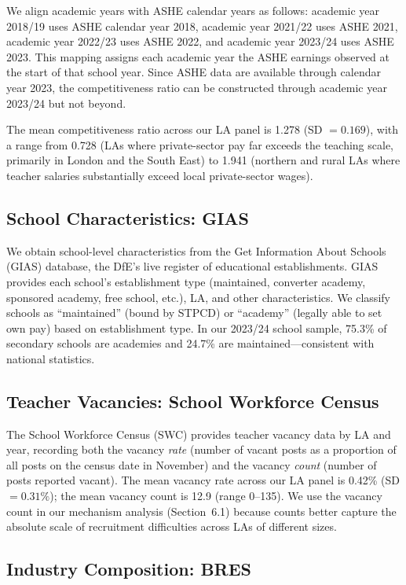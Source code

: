 \documentclass[12pt]{article}
\begin{document}
We align academic years with ASHE calendar years as follows: academic year 2018/19 uses ASHE calendar year 2018, academic year 2021/22 uses ASHE 2021, academic year 2022/23 uses ASHE 2022, and academic year 2023/24 uses ASHE 2023. This mapping assigns each academic year the ASHE earnings observed at the start of that school year. Since ASHE data are available through calendar year 2023, the competitiveness ratio can be constructed through academic year 2023/24 but not beyond.

The mean competitiveness ratio across our LA panel is 1.278 (SD $= 0.169$), with a range from 0.728 (LAs where private-sector pay far exceeds the teaching scale, primarily in London and the South East) to 1.941 (northern and rural LAs where teacher salaries substantially exceed local private-sector wages).

\subsection{School Characteristics: GIAS}

We obtain school-level characteristics from the Get Information About Schools (GIAS) database, the DfE's live register of educational establishments. GIAS provides each school's establishment type (maintained, converter academy, sponsored academy, free school, etc.), LA, and other characteristics. We classify schools as ``maintained'' (bound by STPCD) or ``academy'' (legally able to set own pay) based on establishment type. In our 2023/24 school sample, 75.3\% of secondary schools are academies and 24.7\% are maintained---consistent with national statistics.

\subsection{Teacher Vacancies: School Workforce Census}

The School Workforce Census (SWC) provides teacher vacancy data by LA and year, recording both the vacancy \textit{rate} (number of vacant posts as a proportion of all posts on the census date in November) and the vacancy \textit{count} (number of posts reported vacant). The mean vacancy rate across our LA panel is 0.42\% (SD $= 0.31\%$); the mean vacancy count is 12.9 (range 0--135). We use the vacancy count in our mechanism analysis (Section~6.1) because counts better capture the absolute scale of recruitment difficulties across LAs of different sizes.

\subsection{Industry Composition: BRES}
\end{document}
